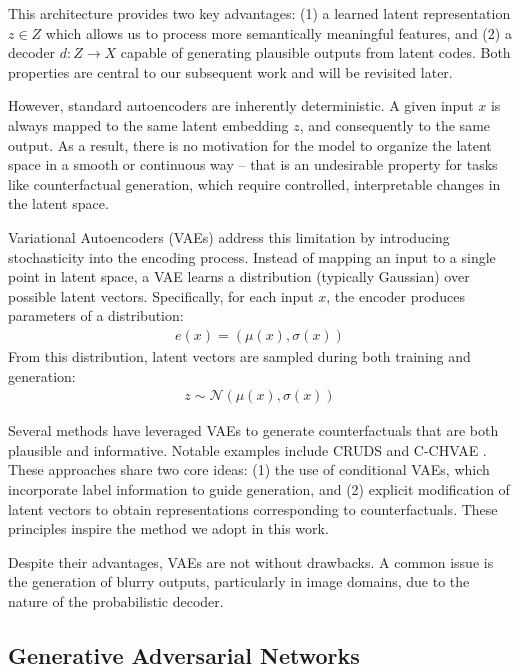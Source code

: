 This architecture provides two key advantages: (1) a learned latent representation $z \in Z$ which allows us to process more semantically meaningful features,
and (2) a decoder $d : Z \to X$ capable of generating plausible outputs from latent codes.
Both properties are central to our subsequent work and will be revisited later.

However, standard autoencoders are inherently deterministic. A given input $x$ is always mapped to the same latent embedding $z$,
and consequently to the same output. As a result, there is no motivation for the model to organize the latent space in a smooth or continuous way -- that is an undesirable property for tasks like counterfactual generation,
which require controlled, interpretable changes in the latent space.

Variational Autoencoders (VAEs) \cite{kingma2019introduction} address this limitation by introducing stochasticity into the encoding process.
Instead of mapping an input to a single point in latent space, a VAE learns a distribution (typically Gaussian) over possible latent vectors.
Specifically, for each input $x$, the encoder produces parameters of a distribution:
\begin{align*}
    e(x) = (\mu(x), \sigma(x))
\end{align*}
From this distribution, latent vectors are sampled during both training and generation:
\begin{align*}
    z \sim \mathcal{N}(\mu(x), \sigma(x))
\end{align*}

Several methods have leveraged VAEs to generate counterfactuals that are both plausible and informative.
Notable examples include CRUDS \cite{downs2020cruds} and C-CHVAE \cite{pawelczyk2020learning}.
These approaches share two core ideas: (1) the use of conditional VAEs, which incorporate label information to guide generation,
and (2) explicit modification of latent vectors to obtain representations corresponding to counterfactuals. These principles inspire the method we adopt in this work.

Despite their advantages, VAEs are not without drawbacks. A common issue is the generation of blurry outputs, particularly in image domains,
due to the nature of the probabilistic decoder.

\subsection{Generative Adversarial Networks}

